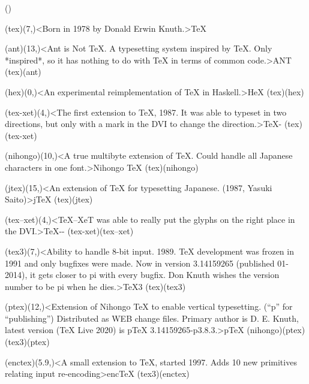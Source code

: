 \clearpage
{}

\label{sec:tree}
\Large
\centering

\label{textextview}
\tograph*({}){
	\tonode[\vip](tex)(7,\layer)<Born in 1978 by Donald Erwin Knuth.>{\TeX}
	
	\tonode[\program](ant)(13,\layer)<Ant is Not TeX. A typesetting system inspired by TeX. Only *inspired*, so it has nothing to do with TeX in terms of common code.>{ANT}
	\todraw[dotted](tex)(ant)

	\tonode[\program](hex)(0,\layer)<An experimental reimplementation of TeX in Haskell.>{HeX}
	\todraw[dotted](tex)(hex)
	
	\steplayer[-1.5]
	\tonode(tex-xet)(4,\layer)<The first extension to TeX, 1987. It was able to typeset in two directions, but only with a mark in the DVI to change the direction.>{\TeX-\XeT}
	\todraw(tex)(tex-xet)

	\tonode(nihongo)(10,\layer)<A true multibyte extension of TeX. Could handle all Japanese characters in one font.>{Nihongo \TeX}
	\todraw(tex)(nihongo)
	
	\tonode(jtex)(15,\layer)<An extension of TeX for typesetting Japanese. (1987, Yasuki Saito)>{j\TeX}
		\todraw(tex)(jtex)

	\steplayer[-1.5]

	\tonode(tex--xet)(4,\layer)<TeX--XeT was able to really put the glyphs on the right place in the DVI.>{\TeX-{}-\XeT}
		\todraw(tex-xet)(tex--xet)

	\tonode[\vip](tex3)(7,\layer)<Ability to handle 8-bit input. 1989. TeX development was frozen in 1991 and only bugfixes were made. Now in version 3.14159265 (published 01-2014), it gets closer to pi with every bugfix. Don Knuth wishes the version number to be pi when he dies.>{\TeX3}
		\todraw*(tex)(tex3)

	\steplayer[-1.5]

	\tonode(ptex)(12,\layer)<Extension of Nihongo TeX to enable vertical typesetting. (“p” for “publishing”)  Distributed as WEB change files. Primary author is D. E. Knuth, latest version (TeX Live 2020) is pTeX 3.14159265-p3.8.3.>{p\TeX}
		\todraw(nihongo)(ptex)
		\todraw(tex3)(ptex)

	\steplayer[-1]
	
	\tonode(enctex)(5.9,\layer)<A small extension to TeX, started 1997. Adds 10 new primitives relating input re-encoding>{enc\TeX}
	\todraw(tex3)(enctex)
	
}
